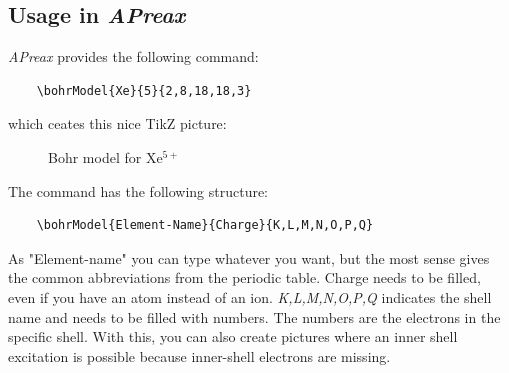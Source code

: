 \documentclass[
	a4paper,
	parskip=half,
    pagesize=auto,      		%
    listof=totoc,   		%
    bibliography=totoc,
	11pt
]{scrartcl}
\begin{document}
\subsection{Usage in \textit{APreax}}
 
\textit{APreax} provides the following command:
 
 \begin{lstlisting}
 	\bohrModel{Xe}{5}{2,8,18,18,3}
 \end{lstlisting}
 
 which ceates this nice TikZ picture: 
 
 
 \begin{figure}[htp]
 	\centering
 	\caption[Bohr model for Xe$^{5+}$]{Bohr model for Xe$^{5+}$}
 	\label{pic:prozess:EA-single}
 \end{figure}

The command has the following structure: 

 \begin{lstlisting}
	\bohrModel{Element-Name}{Charge}{K,L,M,N,O,P,Q}
\end{lstlisting}

As "Element-name" you can type whatever you want, but the most sense gives the common abbreviations from the periodic table. 
Charge needs to be filled, even if you have an atom instead of an ion. 
\textit{K,L,M,N,O,P,Q} indicates the shell name and needs to be filled with numbers. The numbers are the electrons in the specific shell. With this, you can also create pictures where an inner shell excitation is possible because inner-shell electrons are missing. 
\end{document}
